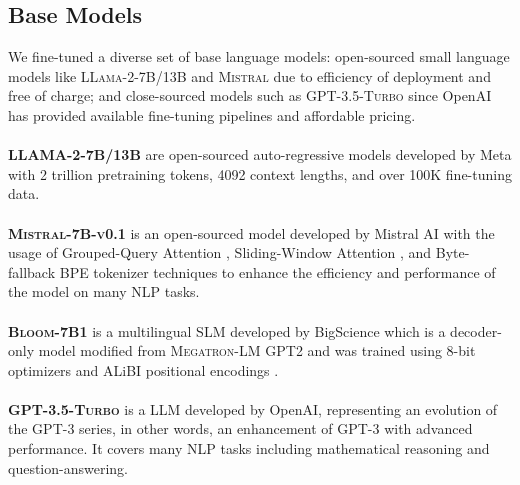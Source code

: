 \documentclass[10pt]{article}
\begin{document}
\subsection{Base Models}\label{sec: model}
We fine-tuned a diverse set of base language models: open-sourced small language models like \textsc{LLama-2-7B/13B} and \textsc{Mistral} due to efficiency of deployment and free of charge; and close-sourced models such as \textsc{GPT-3.5-Turbo} since OpenAI has provided available fine-tuning pipelines and affordable pricing. \\
\\
\textbf{\textsc{LLAMA-2-7B/13B}} \cite{Touvron2023Llama2O} are open-sourced auto-regressive models developed by Meta with 2 trillion pretraining tokens, 4092 context lengths, and over 100K fine-tuning data.\\
\\
\textbf{\textsc{Mistral-7B-v0.1}} \cite{jiang2023mistral7b} is an open-sourced model developed by Mistral AI with the usage of Grouped-Query Attention \cite{ainslie2023gqatraininggeneralizedmultiquery}, Sliding-Window Attention \cite{hassani2023neighborhoodattentiontransformer}, and Byte-fallback BPE tokenizer \cite{Berglund_2023} techniques to enhance the efficiency and performance of the model on many NLP tasks.\\
\\
\textbf{\textsc{Bloom-7B1}} \cite{bigscience2023bloom7b1} is a multilingual SLM developed by BigScience which is a decoder-only model modified from \textsc{Megatron-LM GPT2} \cite{shoeybi2020megatronlmtrainingmultibillionparameter} and was trained using 8-bit optimizers \cite{dettmers20228bitoptimizersblockwisequantization} and ALiBI positional encodings \cite{press2022trainshorttestlong}. \\
\\
\textbf{\textsc{GPT-3.5-Turbo}} \cite{OpenAIGPT35TurboFineTuning} is a LLM developed by OpenAI, representing an evolution of the GPT-3 series, in other words, an enhancement of GPT-3 with advanced performance. It covers many NLP tasks including mathematical reasoning and question-answering. 
\end{document}
